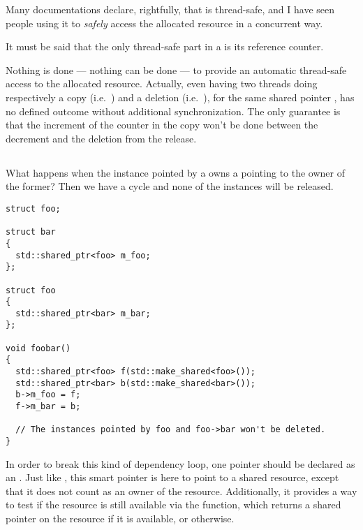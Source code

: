 \begin{pitfall}
Many documentations declare, rightfully, that 
is thread-safe, and I have seen people using it to \emph{safely}
access the allocated resource in a concurrent way.

\bigskip

It must be said that the only thread-safe part in a
 is its reference counter.

\bigskip

Nothing is done — nothing can be done — to provide an automatic
thread-safe access to the allocated resource. Actually, even having
two threads doing respectively a copy (i.e.\ ) and a deletion (i.e.\ ), for the same
shared pointer , has no defined outcome without additional
synchronization. The only guarantee is that the increment of the
counter in the copy won't be done between the decrement and the
deletion from the release.

\end{pitfall}

\subsection{}

What happens when the instance pointed by a 
owns a  pointing to the owner of the former?
Then we have a cycle and none of the instances will be released.

\begin{lstlisting}
struct foo;

struct bar
{
  std::shared_ptr<foo> m_foo;
};

struct foo
{
  std::shared_ptr<bar> m_bar;
};

void foobar()
{
  std::shared_ptr<foo> f(std::make_shared<foo>());
  std::shared_ptr<bar> b(std::make_shared<bar>());
  b->m_foo = f;
  f->m_bar = b;

  // The instances pointed by foo and foo->bar won't be deleted.
}
\end{lstlisting}

In order to break this kind of dependency loop, one pointer should be
declared as an . Just like
, this smart pointer is here to point to a
shared resource, except that it does not count as an owner of the
resource. Additionally, it provides a way to test if the resource is
still available via the  function, which
returns a shared pointer on the resource if it is available, or
 otherwise.


